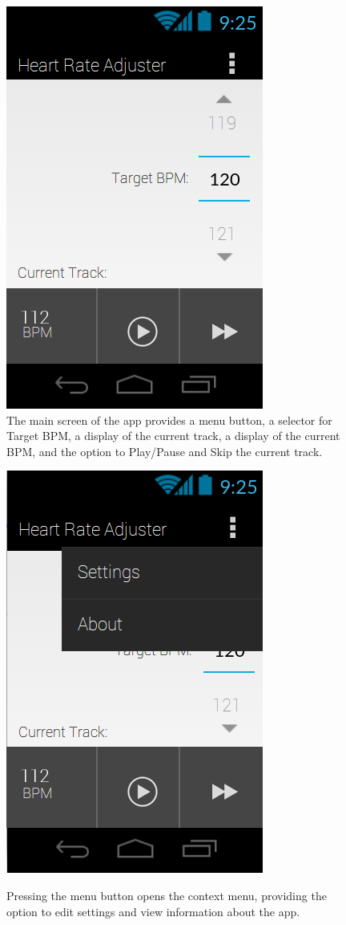 \documentclass[letterpaper,english]{scrreprt}
\begin{document}
\begin{figure}[H]
	\centering
	\includegraphics{mobile_ui/1.png}
	\caption{The main screen of the app provides a menu button, a selector for Target BPM, a display of the current track, a display of the current BPM, and the option to Play/Pause and Skip the current track.}
\end{figure}

\begin{figure}[H]
	\centering
	\includegraphics{mobile_ui/2.png}\\
	\caption{Pressing the menu button opens the context menu, providing the option to edit settings and view information about the app.}
\end{figure}
\end{document}

